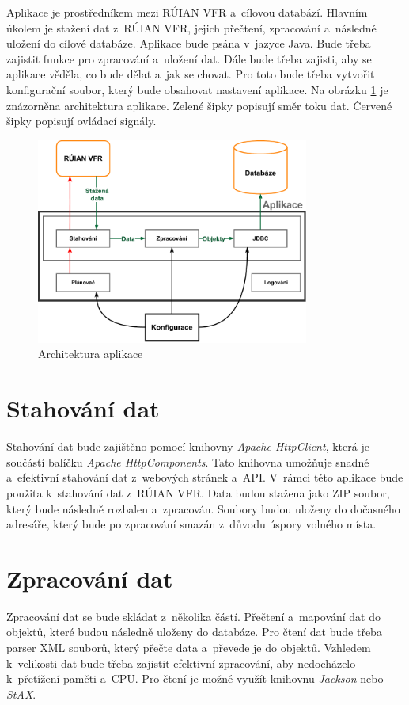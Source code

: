 Aplikace je prostředníkem mezi RÚIAN VFR a~cílovou databází.
Hlavním úkolem je stažení dat z~RÚIAN VFR, jejich přečtení, zpracování a~následné uložení do cílové databáze.
Aplikace bude psána v~jazyce Java. Bude třeba zajistit funkce pro zpracování a~uložení dat.
Dále bude třeba zajisti, aby se aplikace věděla, co bude dělat a~jak se chovat.
Pro toto bude třeba vytvořit konfigurační soubor, který bude obsahovat nastavení aplikace.
Na obrázku \ref{fig:architektura} je znázorněna architektura aplikace.
Zelené šipky popisují směr toku dat.
Červené šipky popisují ovládací signály.

\begin{figure}[!h]
    \centering
    \includegraphics[width=0.8\textwidth]{figures/Aplikace_Scheme.pdf}
    \caption{Architektura aplikace}
    \label{fig:architektura}
\end{figure}

\newpage

\section{Stahování dat}
Stahování dat bude zajištěno pomocí knihovny \textit{Apache HttpClient}, která je
součástí balíčku \textit{Apache HttpComponents}.
Tato knihovna umožňuje snadné a~efektivní stahování dat z~webových stránek a~API.
V~rámci této aplikace bude použita k~stahování dat z~RÚIAN VFR.
Data budou stažena jako ZIP soubor, který bude následně rozbalen a~zpracován.
Soubory budou uloženy do dočasného adresáře, který bude po zpracování smazán z~důvodu úspory volného místa.

\section{Zpracování dat}
Zpracování dat se bude skládat z~několika částí.
Přečtení a~mapování dat do objektů, které budou následně uloženy do databáze.
Pro čtení dat bude třeba parser XML souborů, který přečte data a~převede je do objektů.
Vzhledem k~velikosti dat bude třeba zajistit efektivní zpracování, aby nedocházelo
k~přetížení paměti a~CPU.
Pro čtení je možné využít knihovnu \textit{Jackson} nebo \textit{StAX}.

